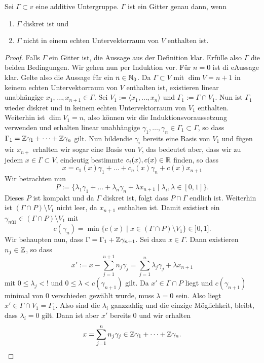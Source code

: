 \begin{lemma}
  \label{lemma:gitter}
  Sei $\Gamma \subset v$ eine additive Untergruppe. $\Gamma$ ist ein
  Gitter genau dann, wenn
  \begin{enumerate}
  \item $\Gamma$ diskret ist und
  \item $\Gamma$ nicht in einem echten Untervektorraum von $V$
    enthalten ist.
  \end{enumerate}
\end{lemma}

\begin{proof}
  Falls $\Gamma$ ein Gitter ist, die Aussage aus der Definition
  klar. Erfülle also $\Gamma$ die beiden Bedingungen. Wir gehen nun
  per Induktion vor. Für $n = 0$ ist di eAussage klar. Gelte also die
  Aussage für ein $n \in \mathbb{N}_0$. Da $\Gamma \subset V$ mit $\dim V =
  n+1$ in keinem echten
  Untervektorraum von $V$ enthalten ist, existieren linear unabhängige $x_1, \dots,
  x_{n+1} \in \Gamma$. Sei $V_1 := \langle x_1, \dots, x_n \rangle$
  und $\Gamma_1 := \Gamma \cap V_1$. Nun ist $\Gamma_1$ wieder diskret
  und in keinem echten Untervektorraum von $V_1$ enthalten. Weiterhin
  ist $\dim V_1 = n$, also können wir die Induktionsvoraussetzung
  verwenden und erhalten linear unabhängige $\gamma_1, \dots, \gamma_n
  \in \Gamma_1 \subset \Gamma$, so dass $\Gamma_1 = \mathbb{Z} \gamma_1 +
  \dots + \mathbb{Z} \gamma_n$ gilt. Nun bildendie $\gamma_i$ bereits eine
  Basis von $V_1$ und fügen wir $x_{n+}$ erhalten wir sogar eine Basis
  von $V$, das bedeutet aber, dass wir zu jedem $x \in \Gamma \subset
  V$, eindeutig bestimmte $c_i(x), c(x) \in \mathbb{R}$ finden, so dass
  \[
  x = c_1(x) \gamma_1 + \dots + c_n(x) \gamma_n + c(x) x_{n+1}
  \]
  Wir betrachten nun
  \[
  P := \{ \lambda_1 \gamma_1 + \dots + \lambda_n \gamma_n + \lambda
  x_{n+1} \mid \lambda_i, \lambda \in [0,1] \}.
  \]
  Dieses $P$ ist kompakt und da $\Gamma$ diskret ist, folgt dass $P
  \cap \Gamma$ endlich ist. Weiterhin ist $( \Gamma \cap P) \setminus
  V_1$ nicht leer, da $x_{n+1}$ enthalten ist. Damit existiert ein
  $\gamma_{nü1} \in ( \Gamma \cap P) \setminus V_1$ mit
  \[
  c(\gamma_n) = \min \{ c(x) \mid x \in ( \Gamma \cap P ) \setminus
  V_1 \} \in ]0, 1].
  \]
  Wir behaupten nun, dass $\Gamma = \Gamma_1 + \mathbb{Z} \gamma_{n+1}$. Sei
  dazu $x \in \Gamma$. Dann existieren $n_j \in \mathbb{Z}$, so dass
  \[
  x' := x - \sum_{j=1}^{n+1} n_j \gamma_j = \sum_{j=1}^n \lambda_j
  \gamma_j + \lambda x_{n+1}
  \]
  mit $0 \leq \lambda_j < !$ und $0 \leq \lambda < c(\gamma_{n+1})$
  gilt. Da $x' \in \Gamma \cap P$ liegt und $c(\gamma_{n+1})$ minimal
  von 0 verschieden gewählt wurde, muss $\lambda = 0$ sein. Also liegt
  $x' \in \Gamma \cap V_1 = \Gamma_1$. Also sind die $\lambda_i$
  ganzzahlig und die einzige Möglichkeit, bleibt, dass $\lambda_i = 0$
  gilt. Dann ist aber $x'$ bereits 0 und wir erhalten
  \[
  x = \sum_{j=1}^n n_j \gamma_j \in \mathbb{Z} \gamma_1 + \dots + \mathbb{Z} \gamma_n.
  \]
\end{proof}

